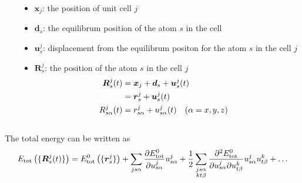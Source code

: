 \begin{frame}
\begin{columns}
\begin{column}{0.5\textwidth}
\begin{center}
\begin{tikzpicture}
            \end{tikzpicture}
        \end{center}
    \end{column}

    \begin{column}{0.45\textwidth}
      \begin{itemize}
      \item $\boldsymbol{x}_j$: the position of unit cell $j$
      \item $\boldsymbol{d}_s$: the equilibrum position of the atom $s$ in the cell
      \item $\boldsymbol{u}^j_s$: displacement from the equilibrum positon for the atom $s$ in the cell $j$
      \item $\boldsymbol{R}^j_s$: the position of the atom $s$ in the cell $j$
        \begin{align*}
          \boldsymbol{R}^j_s(t) &= \boldsymbol{x}_j + \boldsymbol{d}_s
                                + \boldsymbol{u}^j_s(t) \cr
                                  &= \boldsymbol{r}^j_s + \boldsymbol{u}^j_s(t)  \cr
          {R}_{s\alpha}^j(t) &= {r}_{s\alpha}^j + {u}_{s\alpha}^j(t) 
          \quad (\alpha= x,y,z)
        \end{align*}
      \end{itemize}
    \end{column}
  \end{columns}

  \bigskip
  The total energy can be written as
  \begin{equation*}
    E_{\text{tot}}\left(\{\boldsymbol{R}^j_s(t)\}\right) = 
    E^0_{\text{tot}}\left(\{\boldsymbol{r}^j_s\}\right) +
    \sum_{js\alpha} \frac{
      \partial E^0_{\text{tot}} %
    }{
      \partial {u}_{s\alpha}^j
    } {{u}_{s\alpha}^j} +
    {1\over2} \sum_{\substack{js\alpha \\ kt\beta}}
    \frac{
      \partial^2 E^0_{\text{tot}} %
    }{
      \partial {u}_{s\alpha}^j
      \partial {u}_{t\beta}^k
    } \tikzmark{IFC}
    {{u}_{s\alpha}^j} {{u}_{t\beta}^k}
    + \ldots
  \end{equation*}
  \vspace{-6pt}



\end{frame}
